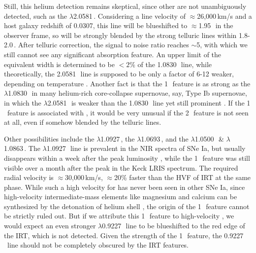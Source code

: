 \documentclass[twocolumn]{aastex631}
\begin{document}
Still, this helium detection remains skeptical, since other  are not unambiguously detected, such as the  $\lambda$2.0581\,\micron. Considering a line velocity of $\approx$26,000\,km/s and a host galaxy redshift of 0.0307, this line will be blueshifted to $\approx$1.95\,\micron\ in the observer frame, so will be strongly blended by the strong telluric lines within 1.8-2.0\,\micron. After telluric correction, the signal to noise ratio reaches $\sim$5, with which we still cannot see any significant absorption feature. An upper limit of the equivalent width is determined to be $<2\%$ of the 1.0830\,\micron\ line, while theoretically, the 2.0581\,\micron\ line is supposed to be only a factor of 6-12 weaker, depending on temperature \citep{Marion2009_NIR}. Another fact is that the 1\,\micron\ feature is as strong as the  $\lambda$1.0830\,\micron\ in many helium-rich core-collapse supernovae, say, Type Ib supernovae, in which the  $\lambda$2.0581\,\micron\ is weaker than the 1.0830\,\micron\ line yet still prominent \citep{CSP_Ibc_2022}. If the 1\,\micron\ feature is associated with , it would be very unusual if the 2\,\micron\ feature is not seen at all, even if somehow blended by the telluric lines.

Other possibilities include the  $\lambda$1.0927\,\micron, the  $\lambda$1.0693\,\micron, and the  $\lambda$1.0500\,\micron\ \& $\lambda$1.0863\,\micron. The  $\lambda$1.0927\,\micron\ line is prevalent in the NIR spectra of SNe Ia, but usually disappears within a week after the peak luminosity \citep{Marion2009_NIR}, while the 1\,\micron\ feature was still visible over a month after the peak in the Keck LRIS spectrum. The required radial velocity is $\approx$30,000\,km/s, $\approx$20\% faster than the HVF of  IRT at the same phase. While such a high velocity for  has never been seen in other SNe Ia, since high-velocity intermediate-mass elements like magnesium and calcium can be synthesized by the detonation of helium shell \citep{Shen_DD_2014}, the  origin of the 1\,\micron\ feature cannot be strictly ruled out. But if we attribute this 1\,\micron\ feature to high-velocity , we would expect an even stronger $\lambda$0.9227\,\micron\ line to be blueshifted to the red edge of the  IRT, which is not detected. Given the strength of the 1\,\micron\ feature, the 0.9227\,\micron\ line should not be completely obscured by the  IRT features. 
\end{document}
